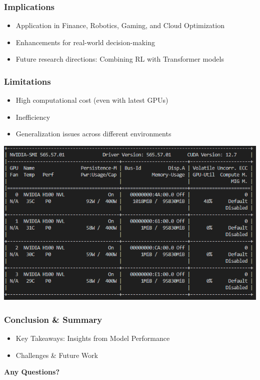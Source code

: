 \begin{frame}
    \frametitle{Implications}
    \begin{itemize}
        \item Application in Finance, Robotics, Gaming, and Cloud Optimization
        \item Enhancements for real-world decision-making
        \item Future research directions: Combining RL with Transformer models
    \end{itemize}
\end{frame}

\begin{frame}
    \frametitle{Limitations}
    \begin{itemize}
        \item High computational cost (even with latest GPUs)
        \item Inefficiency
        \item Generalization issues across different environments
    \end{itemize}
    \centering
    \vspace{-0.4cm}
    \includegraphics[scale=0.75]{h100}
\end{frame}

\begin{frame}
    \frametitle{Conclusion \& Summary}
    \begin{itemize}
        \item Key Takeaways: Insights from Model Performance
        \item Challenges \& Future Work
    \end{itemize}
    \pause
    \centering
    \textbf{Any Questions?}
\end{frame}



